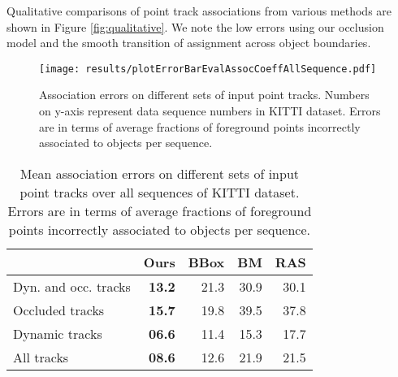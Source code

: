 Qualitative comparisons of point track associations from various methods are shown in Figure \ref{fig:qualitative}. We note the low errors using our occlusion model and the smooth transition of assignment across object boundaries.

\begin{figure*}
\texttt{[image: results/plotErrorBarEvalAssocCoeffAllSequence.pdf]}
  \caption{Association errors on different sets of input point tracks. Numbers on y-axis represent data sequence numbers in KITTI dataset. Errors are in terms of average fractions of foreground points incorrectly associated to objects per sequence.}
\label{fig:assoc-occ-results}
\end{figure*}
\begin{table}
\begin{tabular}{lrrrr}
  \toprule
  & Ours & BBox & BM & RAS\\
  \midrule
  Dyn. and occ. tracks        & \textbf{13.2} & 21.3 & 30.9 & 30.1 \\
  Occluded tracks             & \textbf{15.7} & 19.8 & 39.5 & 37.8 \\
  Dynamic tracks              & \textbf{06.6} & 11.4 & 15.3 & 17.7 \\
  All tracks                  & \textbf{08.6} & 12.6 & 21.9 & 21.5 \\
  \bottomrule
\end{tabular}
\caption{Mean association errors on different sets of input point tracks over all sequences of KITTI dataset. Errors are in terms of average fractions of foreground points incorrectly associated to objects per sequence.}
\label{tab:meanAssoc}
\end{table}



